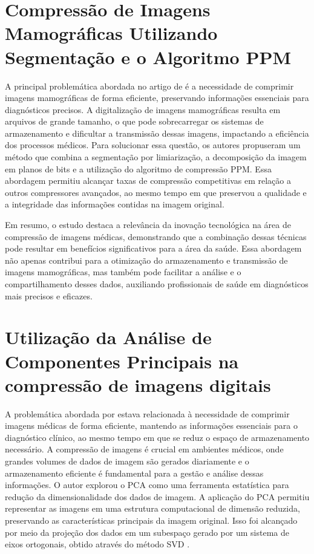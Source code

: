 \section{Compressão de Imagens Mamográficas Utilizando Segmentação e o Algoritmo \acrshort{PPM}}
A principal problemática abordada no artigo de  é a necessidade de  comprimir imagens mamográficas de forma eficiente, preservando informações essenciais para diagnósticos precisos. A digitalização de imagens mamográficas resulta em arquivos de grande tamanho, o que pode sobrecarregar os sistemas de armazenamento e dificultar a transmissão dessas imagens, impactando a eficiência dos processos médicos. Para solucionar essa questão, os autores propuseram um método que combina a segmentação por limiarização, a decomposição da imagem em planos de bits e a utilização do algoritmo de compressão \acrfull{PPM}. Essa abordagem permitiu alcançar taxas de compressão competitivas em relação a outros compressores avançados, ao mesmo tempo em que preservou a qualidade e a integridade das informações contidas na imagem original.

Em resumo, o estudo destaca a relevância da inovação tecnológica na área de compressão de imagens médicas, demonstrando  que a combinação dessas técnicas pode resultar em benefícios significativos para a área da saúde. Essa abordagem não apenas contribui para a otimização do armazenamento e transmissão de imagens mamográficas, mas também pode facilitar a análise e o compartilhamento desses dados, auxiliando profissionais de saúde em diagnósticos mais precisos e eficazes. 



\section{Utilização da Análise de Componentes Principais na compressão de imagens digitais}
A problemática abordada por  estava relacionada à necessidade de comprimir imagens médicas de forma eficiente, mantendo as informações essenciais para o diagnóstico clínico, ao mesmo tempo em que se reduz o espaço de armazenamento necessário. A compressão de imagens é crucial em ambientes médicos, onde grandes volumes de dados de imagem são gerados diariamente e o armazenamento eficiente é fundamental para a gestão e análise dessas informações. O autor explorou o \acrshort{PCA} como uma ferramenta estatística para redução da dimensionalidade dos dados de imagem. A aplicação do \acrshort{PCA} permitiu representar as imagens em uma estrutura computacional de dimensão reduzida, preservando as características principais da imagem original. Isso foi alcançado por meio da projeção dos dados em um subespaço gerado por um sistema de eixos ortogonais, obtido através do método \acrfull{SVD} \cite{santos2012PCACompression}.

